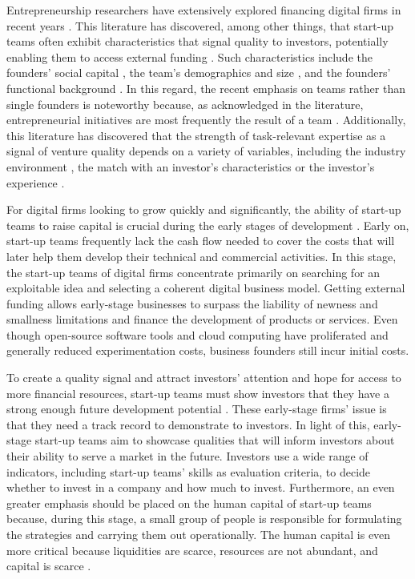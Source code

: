 \documentclass[12pt]{article}
\begin{document}
Entrepreneurship researchers have extensively explored financing digital firms in recent years \citep{klein2020start}. This literature has discovered, among other things, that start-up teams often exhibit characteristics that signal quality to investors, potentially enabling them to access external funding \citep{roure1990predictors, reese2020should}. Such characteristics include the founders' social capital \citep{shane2002network}, the team's demographics and size \citep{eisenhardt1990organizational}, and the founders' functional background \citep{ensley1998effect}. In this regard, the recent emphasis on teams rather than single founders is noteworthy because, as acknowledged in the literature, entrepreneurial initiatives are most frequently the result of a team \citep{klotz2014new}. Additionally, this literature has discovered that the strength of task-relevant expertise as a signal of venture quality depends on a variety of variables, including the industry environment \citep{townsend2015turning}, the match with an investor's characteristics \citep{aggarwal2015evaluating} or the investor's experience \citep{franke2008venture}.

For digital firms looking to grow quickly and significantly, the ability of start-up teams to raise capital is crucial during the early stages of development \citep{rosenbusch2013does}. Early on, start-up teams frequently lack the cash flow needed to cover the costs that will later help them develop their technical and commercial activities. In this stage, the start-up teams of digital firms concentrate primarily on searching for an exploitable idea and selecting a coherent digital business model. Getting external funding allows early-stage businesses to surpass the liability of newness and smallness limitations and finance the development of products or services. Even though open-source software tools and cloud computing have proliferated and generally reduced experimentation costs, business founders still incur initial costs.

To create a quality signal and attract investors' attention and hope for access to more financial resources, start-up teams must show investors that they have a strong enough future development potential \citep{ko2018signaling}. These early-stage firms' issue is that they need a track record to demonstrate to investors. In light of this, early-stage start-up teams aim to showcase qualities that will inform investors about their ability to serve a market in the future. Investors use a wide range of indicators, including start-up teams' skills as evaluation criteria, to decide whether to invest in a company and how much to invest. Furthermore, an even greater emphasis should be placed on the human capital of start-up teams because, during this stage, a small group of people is responsible for formulating the strategies and carrying them out operationally. The human capital is even more critical because liquidities are scarce, resources are not abundant, and capital is scarce \citep{beckman2007early}.
\end{document}
